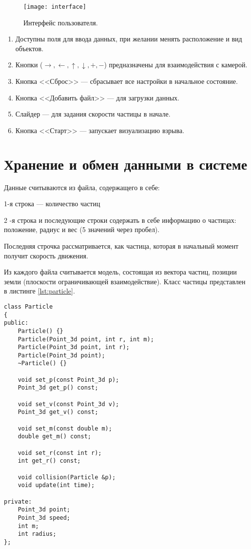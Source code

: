 \begin{figure}[H]
	\centering
	\texttt{[image: interface]}
	\caption{Интерфейс пользователя. }
	\label{img:interface}
\end{figure}

\begin{enumerate}
	\item Доступны поля для ввода данных, при желании менять расположение и вид объектов. 
	\item Кнопки ($\to, \leftarrow, \uparrow, \downarrow, +, -$) предназначены для взаимодействия с камерой. 
	\item Кнопка  <<Сброс>> --- сбрасывает все настройки в начальное состояние. 
	\item Кнопка <<Добавить файл>> --- для загрузки данных. 
	\item Слайдер --- для задания скорости частицы в начале. 
	\item Кнопка <<Старт>> --- запускает визуализацию взрыва.   
\end{enumerate}

\section{\textbf{Хранение и обмен данными в системе }}

Данные считываются из файла, содержащего в себе:

1-я строка --- количество частиц

2 -я строка и последующие строки содержать в себе информацию о частицах: положение, радиус и вес (5 значений через пробел). 

Последняя строчка рассматривается, как частица, которая в начальный момент получит скорость движения. 

Из каждого файла считывается модель, состоящая из вектора частиц, позиции земли (плоскости ограничивающей взаимодействие). Класс частицы представлен в листинге \ref{lst:particle}. 


\begin{lstlisting}[caption=Класс частицы. , label = lst:particle, style=simplecode]
class Particle
{
public:
    Particle() {}
    Particle(Point_3d point, int r, int m);
    Particle(Point_3d point, int r);
    Particle(Point_3d point);
    ~Particle() {}

    void set_p(const Point_3d p);
    Point_3d get_p() const;

    void set_v(const Point_3d v);
    Point_3d get_v() const;

    void set_m(const double m);
    double get_m() const;

    void set_r(const int r);
    int get_r() const;

    void collision(Particle &p);
    void update(int time);

private:
    Point_3d point;
    Point_3d speed;
    int m;
    int radius;
};
\end{lstlisting}

